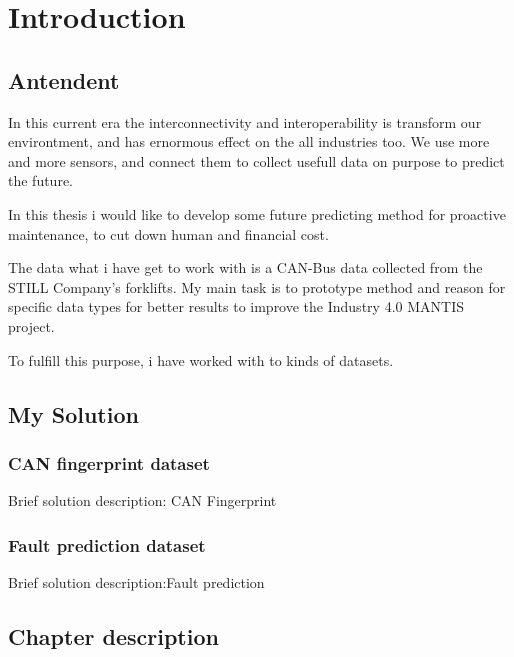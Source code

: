 \chapter*{Introduction}
\section{Antendent}
In this current era the interconnectivity and interoperability is transform our environtment, and has ernormous effect on the all industries too. We use more and more sensors, and connect them to collect usefull data on purpose to predict the future.

In this thesis i would like to develop some future predicting method for proactive maintenance, to cut down human and financial cost.

The data what i have get to work with is a CAN-Bus data collected from the STILL Company's forklifts. My main task is to prototype method and reason for specific data types for better results to improve the Industry 4.0 MANTIS project.

To fulfill this purpose, i have worked with to kinds of datasets.
\section{My Solution}
	\subsection{CAN fingerprint dataset}
Brief solution description: CAN Fingerprint
	\subsection{Fault prediction dataset}
Brief solution description:Fault prediction
\section{Chapter description}
